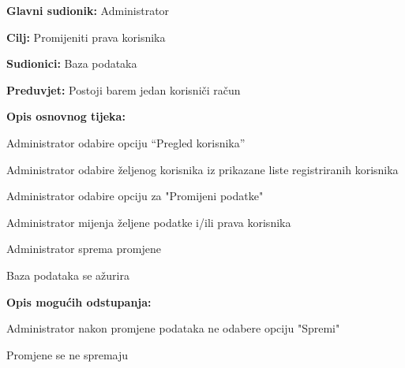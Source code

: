 					\noindent {}
					\begin{packed_item}
	
						\item \textbf{Glavni sudionik: }  Administrator
						\item  \textbf{Cilj:} Promijeniti prava korisnika
						\item  \textbf{Sudionici:} Baza podataka
						\item  \textbf{Preduvjet:} Postoji barem jedan korisniči račun
						\item  \textbf{Opis osnovnog tijeka:} 
						
						
						\item[] \begin{packed_enum}
	
							\item Administrator odabire opciju “Pregled korisnika”
							\item Administrator odabire željenog korisnika iz prikazane liste registriranih korisnika
							\item Administrator odabire opciju za "Promijeni podatke"
							\item Administrator mijenja željene podatke i/ili prava korisnika
							\item Administrator sprema promjene
							\item Baza podataka se ažurira
							
						\end{packed_enum}
						
						\item  \textbf{Opis mogućih odstupanja:}
						
						\item[] \begin{packed_item}
	
							\item[5.a] Administrator nakon promjene podataka ne odabere opciju 
							"Spremi"
							\item[] \begin{packed_enum}
								\item Promjene se ne spremaju
							\end{packed_enum}
							
						\end{packed_item}
					\end{packed_item}

